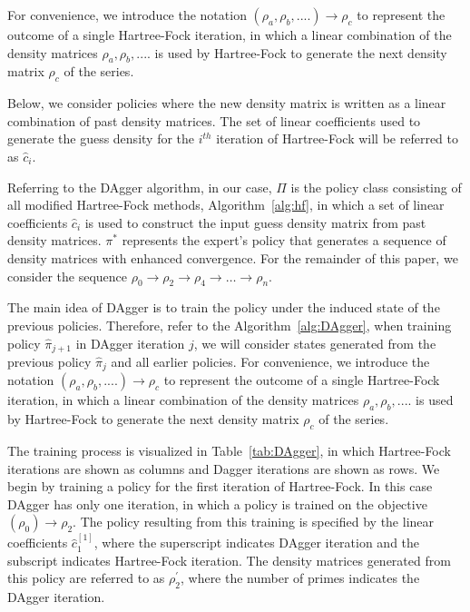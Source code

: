 \documentclass[twoside,11pt]{article}
\begin{document}
For convenience, we introduce the notation $(\rho_a, \rho_b, ....) \rightarrow \rho_c $ to represent the outcome of a single Hartree-Fock iteration, in which a linear combination of the density matrices $\rho_a, \rho_b, ....$ is used by Hartree-Fock to generate the next density matrix $\rho_c$ of the series. 



Below, we consider policies where the new density matrix is written as a linear combination of past density matrices. The set of linear coefficients used to generate the guess density for the $i^{th}$ iteration of Hartree-Fock will be referred to as $\hat{c}_i$.

Referring to the DAgger algorithm, in our case, $\Pi$ is the policy class consisting of all modified Hartree-Fock methods, Algorithm~\ref{alg:hf}, in which a set of linear coefficients $\hat{c}_i$ is used to construct the input guess density matrix from past density matrices. $\pi^*$ represents the expert's policy that generates a sequence of density matrices with enhanced convergence. For the remainder of this paper, we consider the sequence $\rho_0 \rightarrow \rho_2 \rightarrow  \rho_4 \rightarrow  \ldots \rightarrow  \rho_{n}$. 


The main idea of DAgger is to train the policy under the induced state of the previous policies. Therefore, refer to the Algorithm~\ref{alg:DAgger}, when training policy $\hat{\pi}_{j+1}$ in DAgger iteration $j$, we will consider states generated from the previous policy $\hat{\pi}_{j}$ and all earlier policies. For convenience, we introduce the notation $(\rho_a, \rho_b, ....) \rightarrow \rho_c $ to represent the outcome of a single Hartree-Fock iteration, in which a linear combination of the density matrices $\rho_a, \rho_b, ....$ is used by Hartree-Fock to generate the next density matrix $\rho_c$ of the series. 

The training process is visualized in Table~\ref{tab:DAgger}, in which Hartree-Fock iterations are shown as columns and Dagger iterations are shown as rows. We begin by training a policy for the first iteration of Hartree-Fock. In this case DAgger has only one iteration, in which a policy is trained on the objective $(\rho_0) \rightarrow \rho_2$. The policy resulting from this training is specified by the linear coefficients $\hat{c}^{[1]}_1$, where the superscript indicates DAgger iteration and the subscript indicates Hartree-Fock iteration. The density matrices generated from this policy are referred to as $\rho_2^{'}$, where the number of primes indicates the DAgger iteration. 
\end{document}
